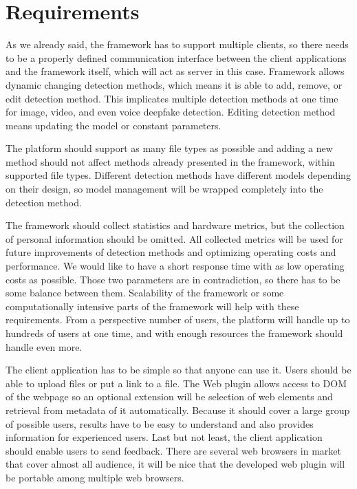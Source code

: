 \section{Requirements}

As we already said, the framework has to support multiple clients, so there needs to be a properly defined communication interface between the client applications and the framework itself, which will act as server in this case. Framework allows dynamic changing detection methods, which means it is able to add, remove, or edit detection method. This implicates multiple detection methods at one time for image, video, and even voice deepfake detection. Editing detection method means updating the model or constant parameters. 

The platform should support as many file types as possible and adding a new method should not affect methods already presented in the framework, within supported file types. Different detection methods have different models depending on their design, so model management will be wrapped completely into the detection method.

The framework should collect statistics and hardware metrics, but the collection of personal information should be omitted. All collected metrics will be used for future improvements of detection methods and optimizing operating costs and performance. We would like to have a short response time with as low operating costs as possible. Those two parameters are in contradiction, so there has to be some balance between them. Scalability of the framework or some computationally intensive parts of the framework will help with these requirements. From a perspective number of users, the platform will handle up to hundreds of users at one time, and with enough resources the framework should handle even more.

The client application has to be simple so that anyone can use it. Users should be able to upload files or put a link to a file. The Web plugin allows access to DOM of the webpage so an optional extension will be selection of web elements and retrieval from metadata of it automatically. Because it should cover a large group of possible users, results have to be easy to understand and also provides information for experienced users. Last but not least, the client application should enable users to send feedback. There are several web browsers in market that cover almost all audience, it will be nice that the developed web plugin will be portable among multiple web browsers.

